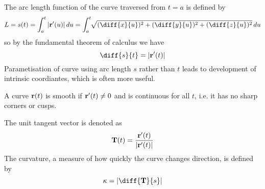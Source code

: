 \documentclass[11pt]{article}
\begin{document}
\begin{definition}
  The arc length function of the curve traversed from \( t=a\) is defined by
  \begin{equation*}
    L = s(t) = \int_a^t |\bf{r}'(u)| \,du = \int_a^t \sqrt[]{(\diff{x}{u})^2 + (\diff{y}{u})^2 + (\diff{z}{u})^2} \,du
  \end{equation*}
  so by the fundamental theorem of calculus we have
  \begin{equation*}
    \diff{s}{t} = |\bf{r}'(t)|
  \end{equation*}
  Parametisation of curve using arc length \(s\) rather than \(t\) leads to development of intrinsic coordiantes, which is often more useful.
\end{definition}

\begin{definition}[Smooth]
  A curve \(\bf{r}(t)\) is smooth if \(\bf{r}'(t) \neq 0\) and is continuous for all \(t\), i.e. it has no sharp corners or cusps.
\end{definition}

\begin{definition}
  The unit tangent vector is denoted as
  \begin{equation*}
    \bf{T}(t) = \frac{\bf{r}'(t)}{|\bf{r}'(t)|}
  \end{equation*}
  The curvature, a measure of how quickly the curve changes direction, is defined by
  \begin{equation*}
    \kappa = \left|\diff{\bf{T}}{s}\right|
  \end{equation*}
\end{definition}
\end{document}
